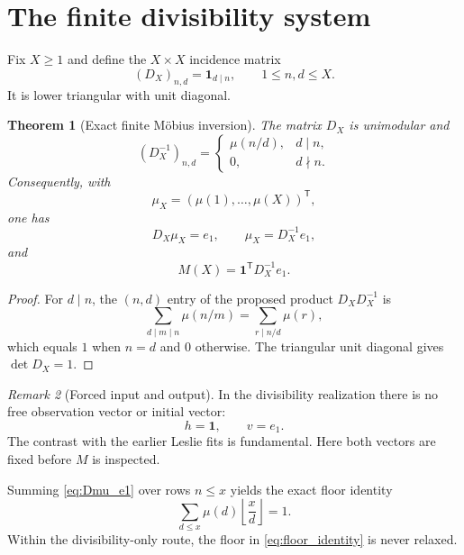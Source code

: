 \documentclass[11pt]{amsart}
\numberwithin{equation}{section}
\theoremstyle{plain}
\newtheorem{theorem}{Theorem}[section]
\theoremstyle{definition}
\theoremstyle{remark}
\newtheorem{remark}[theorem]{Remark}
\begin{document}
\section{The finite divisibility system}
\label{sec:finite_divisibility_system}

Fix $X\ge1$ and define the $X\times X$ incidence matrix
\begin{equation}
(D_X)_{n,d}=\mathbf 1_{d\mid n},
\qquad 1\le n,d\le X.
\label{eq:divisibility_matrix}
\end{equation}
It is lower triangular with unit diagonal.

\begin{theorem}[Exact finite M\"obius inversion]
\label{thm:finite_mobius_inversion}
The matrix $D_X$ is unimodular and
\begin{equation}
(D_X^{-1})_{n,d}
=
\begin{cases}
\mu(n/d),&d\mid n,\\
0,&d\nmid n.
\end{cases}
\label{eq:divisibility_inverse}
\end{equation}
Consequently, with
\[
\mu_X=(\mu(1),\ldots,\mu(X))^{\mathsf T},
\]
one has
\begin{equation}
D_X\mu_X=e_1,
\qquad
\mu_X=D_X^{-1}e_1,
\label{eq:Dmu_e1}
\end{equation}
and
\begin{equation}
M(X)=\mathbf 1^{\mathsf T}D_X^{-1}e_1.
\label{eq:M_as_incidence_observable}
\end{equation}
\end{theorem}

\begin{proof}
For $d\mid n$, the $(n,d)$ entry of the proposed product
$D_XD_X^{-1}$ is
\[
\sum_{d\mid m\mid n}\mu(n/m)
=
\sum_{r\mid n/d}\mu(r),
\]
which equals $1$ when $n=d$ and $0$ otherwise.  The triangular unit diagonal gives
$\det D_X=1$.
\end{proof}

\begin{remark}[Forced input and output]
\label{rem:forced_h_v}
In the divisibility realization there is no free observation vector or initial vector:
\[
\boxed{h=\mathbf 1,\qquad v=e_1.}
\]
The contrast with the earlier Leslie fits is fundamental.  Here both vectors are fixed before
$M$ is inspected.
\end{remark}

Summing \eqref{eq:Dmu_e1} over rows $n\le x$ yields the exact floor identity
\begin{equation}
\sum_{d\le x}\mu(d)
\left\lfloor\frac xd\right\rfloor
=1.
\label{eq:floor_identity}
\end{equation}
Within the divisibility-only route, the floor in \eqref{eq:floor_identity} is never relaxed.
\end{document}
